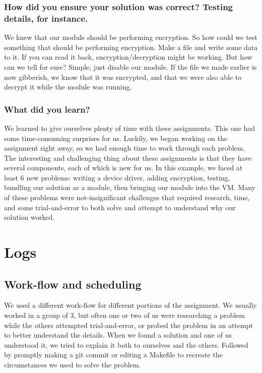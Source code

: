 \documentclass[journal,10pt,onecolumn,compsoc,letterpaper,draftclsnofoot,table,xcdraw]{IEEEtran} \usepackage[margin=0.75in]{geometry}
\begin{document}
\subsubsection{How did you ensure your solution was correct? Testing details, for instance.}

\noindent We knew that our module should be performing encryption.  So how could we test something that should be performing encryption.  Make a file and write some data to it.  If you can read it back, encryption/decryption might be working.  But how can we tell for sure?  Simple, just disable our module.  If the file we made earlier is now gibberish, we know that it was encrypted, and that we were also able to decrypt it while the module was running.

\subsubsection{What did you learn?}

\noindent We learned to give ourselves plenty of time with these assignments.  This one had some time-consuming surprises for us.  Luckily, we began working on the assignment right away, so we had enough time to work through each  problem.  The interesting and challenging thing about these assignments is that they have several components, each of which is new for us. In this example, we faced at least 6 new problems: writing a device driver, adding encryption, testing, bundling our solution as a module, then bringing our module into the VM.  Many of these problems were not-insignificant challenges that required research, time, and some trial-and-error to both solve and attempt to understand why our solution worked.

\section{Logs}
\subsection{Work-flow and scheduling}

\noindent We used a different work-flow for different portions of the assignment.  We usually worked in a group of 3, but often one or two of us were researching a problem while the others attempted trial-and-error, or probed the problem in an attempt to better understand the details.  When we found a solution and one of us understood it, we tried to explain it both to ourselves and the others.  Followed by promptly making a git commit or editing a Makefile to recreate the circumstances we used to solve the problem.
\end{document}
